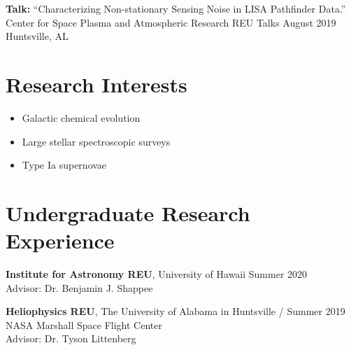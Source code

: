 \documentclass[12pt]{article}
\begin{document}
\textbf{Talk:} ``Characterizing Non-stationary Sensing Noise in LISA Pathfinder Data.'' \\
Center for Space Plasma and Atmospheric Research REU Talks \hfill August 2019 \\
Huntsville, AL

\section*{Research Interests}

\begin{itemize}
    \item Galactic chemical evolution
    \item Large stellar spectroscopic surveys
    \item Type Ia supernovae
\end{itemize}

\section*{Undergraduate Research Experience}

\textbf{Institute for Astronomy REU}, 
University of Hawaii 
\hfill Summer 2020 \\
Advisor: Dr. Benjamin J. Shappee
\vspace{12pt}

\textbf{Heliophysics REU},
The University of Alabama in Huntsville / \hfill Summer 2019 \\
\hspace*{1.5em} NASA Marshall Space Flight Center \\
Advisor: Dr. Tyson Littenberg
\vspace{12pt}
\end{document}
